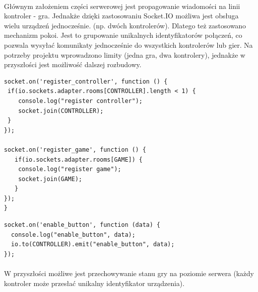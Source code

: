 \paragraph{}
Głównym założeniem części serwerowej jest propagowanie wiadomości na linii kontroler - gra. Jednakże dzięki zastosowaniu Socket.IO możliwa jest obsługa wielu urządzeń jednocześnie. (np. dwóch kontrolerów). Dlatego też zastosowano mechanizm pokoi. Jest to grupowanie unikalnych identyfikatorów połączeń, co pozwala wysyłać komunikaty jednocześnie do wszystkich kontrolerów lub gier. Na potrzeby projektu wprowadzono limity (jedna gra, dwa kontrolery), jednakże w przyszłości jest możliwość dalszej rozbudowy.

\begin{lstlisting}[language=CSharp]
socket.on('register_controller', function () {
 if(io.sockets.adapter.rooms[CONTROLLER].length < 1) {
	console.log("register controller");
	socket.join(CONTROLLER);
 }
});

socket.on('register_game', function () {
   if(io.sockets.adapter.rooms[GAME]) {
	console.log("register game");
	socket.join(GAME);
   }
});
}
\end{lstlisting}

\begin{lstlisting}[language=CSharp]
socket.on('enable_button', function (data) {
  console.log("enable_button", data);
  io.to(CONTROLLER).emit("enable_button", data);
});
\end{lstlisting}
\paragraph{}
W przyszłości możliwe jest przechowywanie stanu gry na poziomie serwera (każdy kontroler może przesłać unikalny identyfikator urządzenia).
